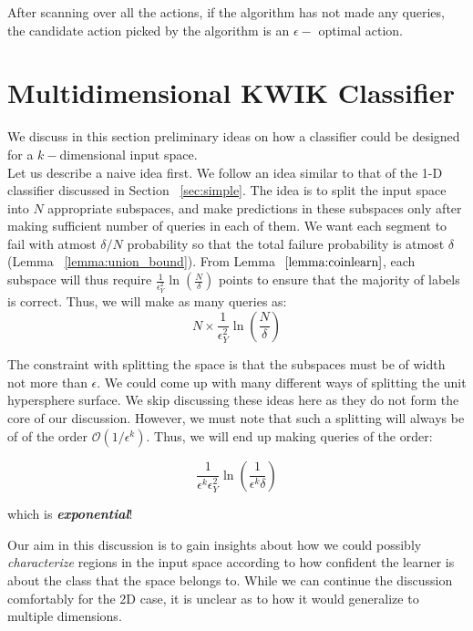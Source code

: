 \begin{corr}
After scanning over all the actions, if the algorithm has not made any queries, the candidate action picked by the algorithm is an ${\epsilon}-$ optimal action.
\end{corr}


\section{Multidimensional KWIK Classifier}
We discuss in this section preliminary ideas on how a classifier could be designed for a $k-$dimensional input space. \\


Let us describe a naive idea first. We follow an idea similar to that of the 1-D classifier discussed in Section ~\ref{sec:simple}. The idea is to split the input space into $N$ appropriate subspaces, and make predictions in these subspaces only after making sufficient number of queries in each of them.
We want each segment to fail with atmost $\delta/N$ probability so that the total failure probability is atmost $\delta$ (Lemma ~\ref{lemma:union_bound}). From Lemma $~\ref{lemma:coinlearn}$, each subspace will thus require $\frac{1}{\epsilon_Y^2} \ln \left( \frac{N}{\delta}\right)$ points to ensure that the majority of labels is correct. Thus, we will make as many queries as:
\begin{equation}
\label{eq:kwiksegment}
N \times\frac{1}{\epsilon_Y^2} \ln \left( \frac{N}{\delta}\right)
\end{equation}

The constraint with splitting the space is that the subspaces must be of width not more than $\epsilon$. We could come up with many different ways of splitting the unit hypersphere surface. We skip discussing these ideas here as they do not form the core of our discussion. However, we must note that such a splitting will always be of of the order $\mathcal{O}(1/\epsilon^k)$. Thus, we will end up making queries of the order:

\begin{equation}
\label{eq:kwiksegment}
\frac{1}{\epsilon^k\epsilon_Y^2} \ln \left( \frac{1}{\epsilon^k\delta}\right)
\end{equation}

which is \textit{\textbf{exponential}}!

Our aim in this discussion is to gain insights about how we could possibly \textit{characterize} regions in the input space according to how confident the learner is about the class that the space belongs to. While we can continue the discussion comfortably for the 2D case, it is unclear as to how it would generalize to multiple dimensions. 

